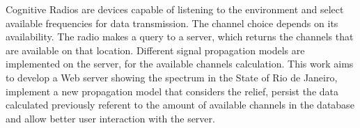 \begin{foreignabstract}

Cognitive Radios are devices capable of listening to the environment and select available frequencies for data transmission. The channel choice depends on its availability. The radio makes a query to a server, which returns the channels that are available on that location. Different signal propagation models are implemented on the server, for the available channels calculation. This work aims to develop a Web server showing the spectrum in the State of Rio de Janeiro, implement a new propagation model that considers the relief, persist the data calculated previously referent to the amount of available channels in the database and allow better user interaction with the server.

\end{foreignabstract}

